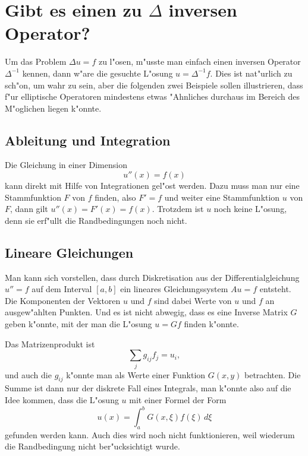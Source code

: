 \section{Gibt es einen zu $\Delta$ inversen Operator?}
Um das Problem $\Delta u=f$ zu l"osen, m"usste man einfach einen
inversen Operator $\Delta^{-1}$ kennen, dann w"are die gesuchte
L"osung $u=\Delta^{-1}f$. Dies ist nat"urlich zu sch"on, um wahr
zu sein, aber die folgenden zwei Beispiele sollen illustrieren,
dass f"ur elliptische Operatoren
mindestens etwas "Ahnliches durchaus im Bereich des M"oglichen
liegen k"onnte.

\subsection{Ableitung und Integration}
Die Gleichung in einer Dimension
\[
u''(x)=f(x)
\]
kann direkt mit Hilfe von Integrationen gel"ost werden. Dazu muss
man nur eine Stammfunktion $F$ von $f$ finden, also $F' = f$ und
weiter eine Stammfunktion $u$ von $F$, dann gilt
$u''(x)=F'(x)=f(x)$. Trotzdem ist $u$ noch keine L"osung, denn 
sie erf"ullt die Randbedingungen noch nicht.

\subsection{Lineare Gleichungen}
Man kann sich vorstellen, dass durch Diskretisation aus der 
Differentialgleichung $u''=f$ auf dem Interval $[a,b]$ ein lineares Gleichungssystem
$Au=f$ entsteht. Die Komponenten der Vektoren $u$ und $f$ sind dabei
Werte von $u$ und $f$ an ausgew"ahlten Punkten. Und es ist nicht
abwegig, dass es eine Inverse Matrix $G$ geben k"onnte, mit der man
die L"osung $u=Gf$ finden k"onnte.

Das Matrizenprodukt ist
\[
\sum_{j}g_{ij}f_j = u_i,
\]
und auch die $g_{ij}$ k"onnte man als Werte einer Funktion $G(x,y)$
betrachten. Die Summe ist dann nur der diskrete Fall eines Integrals,
man k"onnte also auf die Idee kommen, dass
die L"osung $u$ mit einer Formel der Form
\[
u(x)=\int_a^b G(x,\xi)f(\xi)\,d\xi
\]
gefunden werden kann. Auch dies wird noch nicht funktionieren,
weil wiederum die Randbedingung nicht ber"ucksichtigt wurde.

